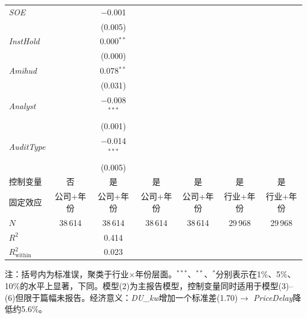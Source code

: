 \documentclass[11pt,a4paper]{article}
\begin{document}
\begin{table}[htbp]
\begin{tabular}{l*{6}{c}}
\textit{SOE}
 & & $-$0.001 & & & & \\
 & & (0.005) & & & & \\[2pt]
\textit{InstHold}
 & & 0.000$^{**}$ & & & & \\
 & & (0.000) & & & & \\[2pt]
\textit{Amihud}
 & & 0.078$^{**}$ & & & & \\
 & & (0.031) & & & & \\[2pt]
\textit{Analyst}
 & & $-$0.008$^{***}$ & & & & \\
 & & (0.001) & & & & \\[2pt]
\textit{AuditType}
 & & $-$0.014$^{***}$ & & & & \\
 & & (0.005) & & & & \\[4pt]
\midrule
控制变量 & 否 & 是 & 是 & 是 & 是 & 是 \\
固定效应 & 公司+年份 & 公司+年份 & 公司+年份 & 公司+年份 & 行业+年份 & 行业+年份 \\
$N$ & 38\,614 & 38\,614 & 38\,614 & 38\,614 & 29\,968 & 29\,968 \\
$R^2$ & & 0.414 & & & & \\
$R^2_{\text{within}}$ & & 0.023 & & & & \\
\bottomrule
\end{tabular}

\vspace{4pt}
{\footnotesize 注：括号内为标准误，聚类于行业$\times$年份层面。$^{***}$、$^{**}$、$^{*}$分别表示在1\%、5\%、10\%的水平上显著，下同。模型(2)为主报告模型，控制变量同时适用于模型(3)--(6)但限于篇幅未报告。经济意义：\textit{DU\_kw}增加一个标准差(1.70)$\to$ \textit{PriceDelay}降低约5.6\%。}
\end{table}


\FloatBarrier
\end{document}
